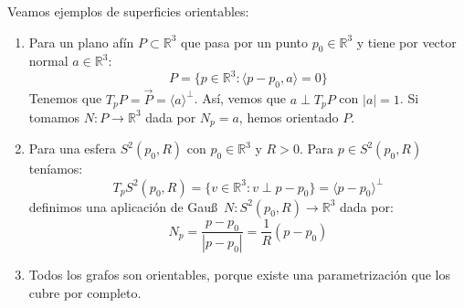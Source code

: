 \begin{ejemplo}
    Veamos ejemplos de superficies orientables:
    \begin{enumerate}
        \item Para un plano afín $P\subset \mathbb{R}^3$  que pasa por un punto $p_0\in \mathbb{R}^3$ y tiene por vector normal $a\in \mathbb{R}^3$:
            \begin{equation*}
                P = \{p\in \mathbb{R}^3 : \langle p-p_0,a \rangle =0\}
            \end{equation*}
            Tenemos que $T_pP = \vec{P} = \langle a \rangle^\perp$. Así, vemos que $a\perp T_pP$ con $|a| =1$. Si tomamos $N:P\to \mathbb{R}^3$ dada por $N_p=a$, hemos orientado $P$.
        \item Para una esfera $S^2(p_0,R)$ con $p_0\in \mathbb{R}^3$ y $R>0$. Para $p\in S^2(p_0,R)$ teníamos:
            \begin{equation*}
                T_pS^2(p_0,R) = \{v\in \mathbb{R}^3 : v\perp p-p_0\} = \langle p-p_0 \rangle^\perp
            \end{equation*}
            definimos una aplicación de Gau\ss\ $N:S^2(p_0,R)\to \mathbb{R}^3$ dada por:
            \begin{equation*}
                N_p = \frac{p-p_0}{|p-p_0|} = \frac{1}{R}(p-p_0)
            \end{equation*}
        \item Todos los grafos son orientables, porque existe una parametrización que los cubre por completo.


\end{enumerate}
\end{ejemplo}
